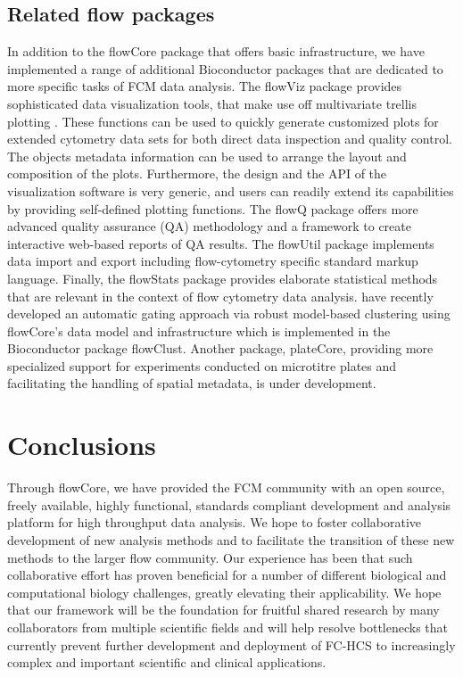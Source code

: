 \documentclass[10pt]{bmc_article}
\newcommand{\Rpackage}[1]{{\textsf{#1}}}
\newenvironment{bmcformat}{\begin{raggedright}\baselineskip20pt\sloppy\setboolean{publ}{false}}{\end{raggedright}\baselineskip20pt\sloppy}
\begin{document}
\begin{bmcformat}
\subsection*{Related flow packages}
In addition to the \Rpackage{flowCore} package that offers basic
infrastructure, we have implemented a range of additional Bioconductor
packages that are dedicated to more specific tasks of FCM data
analysis. The \Rpackage{flowViz} package \cite{sarkar2008ufv}
provides sophisticated data visualization tools, that make use off
multivariate trellis plotting \cite{lattice}.  These functions can be
used to quickly generate customized plots for extended cytometry data
sets for both direct data inspection and quality control.  The objects
metadata information can be used to arrange the layout and composition
of the plots.  Furthermore, the design and the API of the
visualization software is very generic, and users can readily extend
its capabilities by providing self-defined plotting functions.  The
\Rpackage{flowQ} package offers more advanced quality assurance (QA)
methodology and a framework to create interactive web-based reports of
QA results. The \Rpackage{flowUtil} package implements data import and
export including flow-cytometry specific standard markup
language. Finally, the \Rpackage{flowStats} package provides elaborate
statistical methods that are relevant in the context of flow
cytometry data analysis. \cite{lo2008agf} have recently developed an
automatic gating approach via robust model-based clustering using
\Rpackage{flowCore}'s data model and infrastructure which is
implemented in the Bioconductor package \Rpackage{flowClust}. Another
package, \Rpackage{plateCore}, providing more specialized support for
experiments conducted on microtitre plates and facilitating the
handling of spatial metadata, is under development.
    

\section*{Conclusions}
Through \Rpackage{flowCore}, we have provided the FCM community with
an open source, freely available, highly functional, standards
compliant development and analysis platform for high throughput data
analysis.  We hope to foster collaborative development of new analysis
methods and to facilitate the transition of these new methods to the
larger flow community.  Our experience has been that such
collaborative effort has proven beneficial for a number of different
biological and computational biology challenges, greatly elevating
their applicability.  We hope that our framework will be the
foundation for fruitful shared research by many collaborators from
multiple scientific fields and will help resolve bottlenecks that
currently prevent further development and deployment of FC-HCS to
increasingly complex and important scientific and clinical
applications.


\end{bmcformat}
\end{document}
